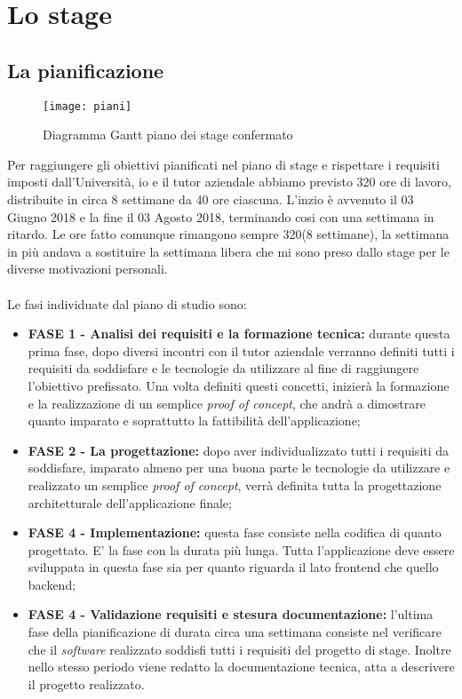 
\chapter{Lo stage}
\label{cap:progettazione}
\label{sec:tecnologie-strumenti}
 \section{La pianificazione}
 \begin{figure}[!h] 
 	\centering 
 	\texttt{[image: piani]} 
 	\caption{Diagramma Gantt piano dei stage confermato}
 \end{figure}
Per raggiungere gli obiettivi pianificati nel piano di stage e rispettare i
requisiti imposti dall’Università, io e il tutor aziendale abbiamo
previsto 320 ore di lavoro, distribuite in circa 8 settimane da 40 ore ciascuna.
L'inzio è avvenuto il 03 Giugno 2018 e la fine il 03 Agosto 2018, 
terminando cosi con una settimana in ritardo. Le ore fatto comunque rimangono sempre 320(8 settimane), la settimana in più andava a sostituire la settimana libera che mi sono preso dallo stage per le diverse motivazioni personali. 
\\
\\
Le fasi individuate dal piano di studio sono:

\begin{itemize}
	\item \textbf{FASE 1 - Analisi dei requisiti e la formazione tecnica:} durante questa prima fase, dopo diversi incontri con il tutor aziendale verranno definiti tutti i requisiti da soddisfare e le tecnologie da utilizzare al fine di raggiungere l'obiettivo prefissato. Una volta definiti questi concetti, inizierà la formazione e la realizzazione di un semplice \emph{proof of concept}, che andrà a dimostrare quanto imparato e soprattutto la fattibilità dell'applicazione;
	\item \textbf{FASE 2 - La progettazione:} dopo aver individualizzato tutti i requisiti da soddisfare, imparato almeno per una buona parte le tecnologie da utilizzare e realizzato un semplice\emph{ proof of concept}, verrà definita tutta la progettazione architetturale dell'applicazione finale;
		\item \textbf{FASE 4 - Implementazione:} questa fase consiste nella codifica di quanto progettato. E' la fase con la durata più lunga. Tutta l'applicazione deve essere sviluppata in questa fase sia per quanto riguarda il lato frontend che quello backend;
		\item \textbf{FASE 4 - Validazione requisiti e stesura documentazione:} l'ultima fase della pianificazione di durata circa una settimana consiste nel verificare che il \emph{software} realizzato soddisfi tutti i requisiti
			del progetto di stage. Inoltre nello stesso periodo viene redatto la documentazione tecnica, atta a descrivere il progetto realizzato.
\end{itemize}

